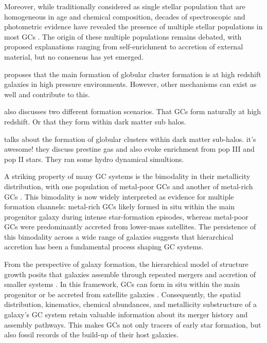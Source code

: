     Moreover, while traditionally considered as single stellar population that are homogeneous in age and chemical composition, decades of spectroscopic and photometric evidence have revealed the presence of multiple stellar populations in most GCs \citep{2008MNRAS.391..825D,2012A&ARv..20...50G,2018ARA&A..56...83B}. The origin of these multiple populations remains debated, with proposed explanations ranging from self-enrichment to accretion of external material, but no consensus has yet emerged.

    \citet{2025arXiv250116438K} proposes that the main formation of globular cluster formation is at high redshift galaxies in high pressure environments. However, other mechanisms can exist as well and contribute to this.
    

    \citet{2018RSPSA.47470616F} also discusses two different formation scenarios. That GCs form naturally at high redshift. Or that they form within dark matter sub halos. 
    
    \citep{2016ApJ...823...52K} talks about  the formation of globular clusters within dark matter sub-halos. it's awesome! they discuss prestine gas and also evoke enrichment from pop III and pop II stars. They ran some hydro dynamical simultions. 

    A striking property of many GC systems is the bimodality in their metallicity distribution, with one population of metal-poor GCs and another of metal-rich GCs \citep[e.g.,][]{2006ARA&A..44..193B, 2015ApJ...806...36H}. This bimodality is now widely interpreted as evidence for multiple formation channels: metal-rich GCs likely formed in situ within the main progenitor galaxy during intense star-formation episodes, whereas metal-poor GCs were predominantly accreted from lower-mass satellites. The persistence of this bimodality across a wide range of galaxies suggests that hierarchical accretion has been a fundamental process shaping GC systems.

    From the perspective of galaxy formation, the hierarchical model of structure growth posits that galaxies assemble through repeated mergers and accretion of smaller systems \citep{2015ARA&A..53...51S}. In this framework, GCs can form in situ within the main progenitor or be accreted from satellite galaxies \citep[e.g.,][]{2018MNRAS.479.4760F,2020MNRAS.498.2472K,2021ApJ...920...51M,2022ApJ...930L...9M,2023A&A...673A..86P,2024MNRAS.528.3198B,2025A&A...693A.155P}. Consequently, the spatial distribution, kinematics, chemical abundances, and metallicity substructure of a galaxy's GC system retain valuable information about its merger history and assembly pathways. This makes GCs not only tracers of early star formation, but also fossil records of the build-up of their host galaxies.

